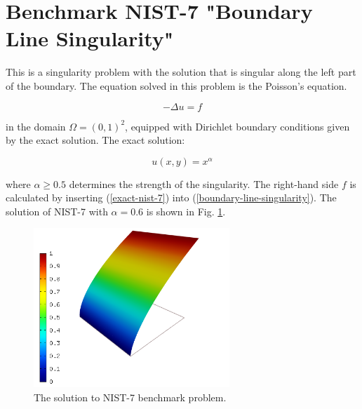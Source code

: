 \section{Benchmark NIST-7 "Boundary Line Singularity"}
\label{sec:bench-7}

This is a singularity problem with the solution that is singular along the left part of the boundary.
The equation solved in this problem is the Poisson's equation.

\begin{equation} \label{boundary-line-singularity}
-\Delta u = f 
\end{equation}

in the domain $\Omega = (0, 1)^2$, equipped with Dirichlet boundary conditions
given by the exact solution. The exact solution:

\begin{equation}\label{exact-nist-7}
u(x,y) = x^{\alpha} 
\end{equation}

where $\alpha \geq 0.5$ determines the strength of the singularity.
The right-hand side $f$ is calculated by inserting (\ref{exact-nist-7}) into (\ref{boundary-line-singularity}).
The solution of NIST-7 with $\alpha = 0.6$ is shown in Fig. \ref{fig:sln-nist07}.

\begin{figure}[!ht]
\centering
\includegraphics[height=6cm]{nist/nist-7/solution.png}
\caption{The solution to NIST-7 benchmark problem.}
\label{fig:sln-nist07}
\end{figure}

